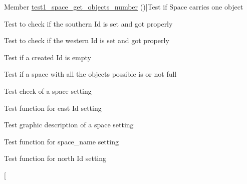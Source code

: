 \begin{DoxyRefList}
Member \hyperlink{space__test_8h_a99dcb9ec68282e5488ea34997a213783}{test1\+\_\+space\+\_\+get\+\_\+objects\+\_\+number} ()]Test if Space carries one object  
\item[\label{test__test000237}%
\hypertarget{test__test000237}{}%
Member \hyperlink{space__test_8h_a8e345065f58565e131bdb3a9d0096ed5}{test1\+\_\+space\+\_\+get\+\_\+south} ()]Test to check if the southern Id is set and got properly  
\item[\label{test__test000241}%
\hypertarget{test__test000241}{}%
Member \hyperlink{space__test_8h_a1f08c6866885bfc093717f57b1b86539}{test1\+\_\+space\+\_\+get\+\_\+west} ()]Test to check if the western Id is set and got properly  
\item[\label{test__test000255}%
\hypertarget{test__test000255}{}%
Member \hyperlink{space__test_8h_af6acddb4ba70ed941100be42d8f40b38}{test1\+\_\+space\+\_\+is\+\_\+empty} ()]Test if a created Id is empty  
\item[\label{test__test000258}%
\hypertarget{test__test000258}{}%
Member \hyperlink{space__test_8h_a9b23efa95cd3c18574cc8c1ef83ae7a9}{test1\+\_\+space\+\_\+is\+\_\+full} ()]Test if a space with all the objects possible is or not full  
\item[\label{test__test000228}%
\hypertarget{test__test000228}{}%
Member \hyperlink{space__test_8h_adedb9f74b100fba85454e4f2b4aca122}{test1\+\_\+space\+\_\+set\+\_\+check} ()]Test check of a space setting  
\item[\label{test__test000221}%
\hypertarget{test__test000221}{}%
Member \hyperlink{space__test_8h_ab1f093af4be3ca8e525d0517cc846f47}{test1\+\_\+space\+\_\+set\+\_\+east} ()]Test function for east Id setting  
\item[\label{test__test000225}%
\hypertarget{test__test000225}{}%
Member \hyperlink{space__test_8h_ad8b51e7da141d7a3b29039a9a1d83013}{test1\+\_\+space\+\_\+set\+\_\+graphic\+\_\+description} ()]Test graphic description of a space setting  
\item[\label{test__test000214}%
\hypertarget{test__test000214}{}%
Member \hyperlink{space__test_8h_a2569bab6cfeec15f722d232bb8c78c9e}{test1\+\_\+space\+\_\+set\+\_\+name} ()]Test function for space\+\_\+name setting  
\item[\label{test__test000217}%
\hypertarget{test__test000217}{}%
Member \hyperlink{space__test_8h_a3d3457a89f705948102cf1e5d4a7b45b}{test1\+\_\+space\+\_\+set\+\_\+north} ()]Test function for north Id setting  
\item[\label{test__test000219}%
\hypertarget{test__test000219}{}%

\end{DoxyRefList}

